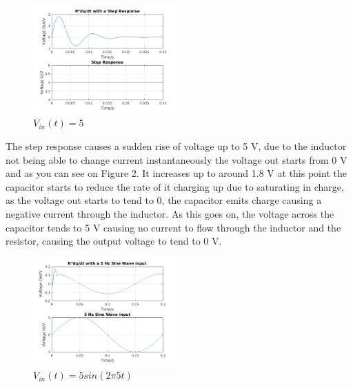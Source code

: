 \documentclass[10pt,a4paper]{article}
\begin{document}
\begin{figure}

	\vspace{-2mm}
  		\includegraphics[width=0.49\textwidth]{Ex3_Figs/Step.png}
	\vspace{-6mm}
  	\caption{$V_{in}(t)= 5$}
  	\label{fig:ex3g1}

\end{figure}

    \vspace{6mm}The step response causes a sudden rise of voltage up to 5 V, due to the inductor not being able to change current instantaneously the voltage out starts from 0 V and as you can see on Figure 2. It increases up to around 1.8 V at this point the capacitor starts to reduce the rate of it charging up due to saturating in charge, as the voltage out starts to tend to 0, the capacitor emits charge causing a negative current through the inductor. As this goes on, the voltage across the capacitor tends to 5 V causing no current to flow through the inductor and the resistor, causing the output voltage to tend to 0 V.

\begin{figure}
    \vspace{-5mm}

  		\includegraphics[width=0.49\textwidth]{Ex3_Figs/5Sine2.png}
	\vspace{-6mm}
  	\caption{$V_{in}(t)= 5sin(2 \pi 5t)$}
  	\label{fig:ex3g2}

\end{figure}
\end{document}
